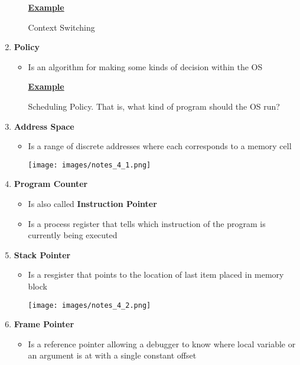 \documentclass[12pt]{article}
\begin{document}
\begin{mdframed}
\begin{enumerate}[1.]
\begin{itemize}
        \bigskip

        \underline{\textbf{Example}}

        \bigskip

        Context Switching
    \end{itemize}
    \item \textbf{Policy}

    \begin{itemize}
        \item Is an algorithm for making some kinds of decision within the OS

        \bigskip

        \underline{\textbf{Example}}

        \bigskip

        Scheduling Policy. That is, what kind of program should the OS run?
    \end{itemize}
    \item \textbf{Address Space}
    \begin{itemize}
        \item Is a range of discrete addresses where each corresponds to a memory cell

        \bigskip

        \begin{center}
        \texttt{[image: images/notes\_4\_1.png]}
        \end{center}

    \end{itemize}
    \item \textbf{Program Counter}
    \begin{itemize}
        \item Is also called \textbf{Instruction Pointer}
        \item Is a process register that tells which instruction of the program
        is currently being executed
    \end{itemize}
    \item \textbf{Stack Pointer}
    \begin{itemize}
        \item Is a resgister that points to the location of last item placed in memory block

        \begin{center}
        \texttt{[image: images/notes\_4\_2.png]}
        \end{center}
    \end{itemize}
    \item \textbf{Frame Pointer}
    \begin{itemize}
        \item Is a reference pointer allowing a debugger to know where local
        variable or an argument is at with a single constant offset


\end{itemize}
\end{enumerate}
\end{mdframed}
\end{document}
